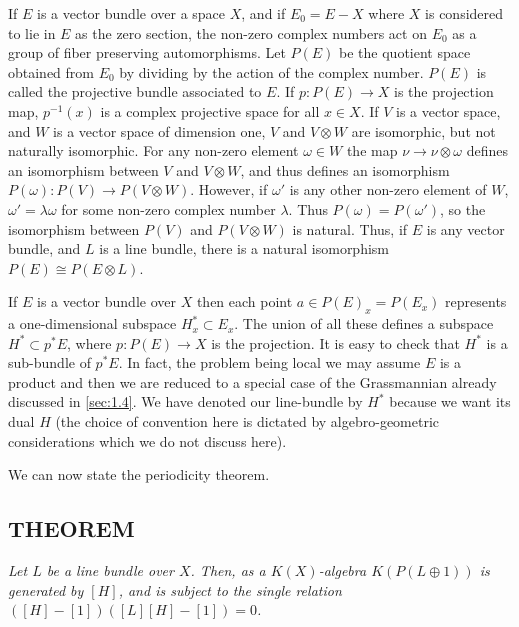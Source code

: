 If $E$ is a vector bundle over a space $X$, and if $E_0 = E - X$ where $X$ is considered to lie in $E$ as the zero section, the non-zero complex numbers act on $E_0$ as a group of fiber preserving automorphisms. Let $P(E)$ be the quotient space obtained from $E_0$ by dividing by the action of the complex number. $P(E)$ is called the projective bundle associated to $E$. If $p: P(E) \to X$ is the projection map, $p^{-1}(x)$ is a complex projective space for all $x \in X$. If $V$ is a vector space, and $W$ is a vector space of dimension one, $V$ and $V \otimes W$ are isomorphic, but not naturally isomorphic. For any non-zero element $\omega \in W$ the map $\nu \to \nu \otimes \omega$ defines an isomorphism between $V$ and $V \otimes W$, and thus defines an isomorphism $P(\omega): P(V) \to P(V \otimes W)$. However, if $\omega'$ is any other non-zero element of $W$, $\omega' = \lambda \omega$ for some non-zero complex number $\lambda$. Thus $P(\omega) = P(\omega')$, so the isomorphism between $P(V)$ and $P(V \otimes W)$ is natural. Thus, if $E$ is any vector bundle, and $L$ is a line bundle, there is a natural isomorphism $P(E) \cong P(E \otimes L)$. \par 

If $E$ is a vector bundle over $X$ then each point $a \in P(E)_x = P(E_x)$ represents a one-dimensional subspace $H^*_x \subset E_x$. The union of all these defines a subspace $H^* \subset p^*E$, where $p: P(E) \to X$ is the projection. It is easy to check that $H^*$ is a sub-bundle of $p^*E$. In fact, the problem being local we may assume $E$ is a product and then we are reduced to a special case of the Grassmannian already discussed in \cref{sec:1.4}. We have denoted our line-bundle by $H^*$ because we want its dual $H$ (the choice of convention here is dictated by algebro-geometric considerations which we do not discuss here). \par 

We can now state the periodicity theorem. \par 

\subsection{THEOREM}\label{the:2.2.1} \textit{Let $L$ be a line bundle over $X$. Then, as a $K(X)$-algebra $K(P(L \oplus 1))$ is generated by $[H]$, and is subject to the single relation \linebreak $([H] - [1])([L][H] - [1]) = 0$.} \par 

